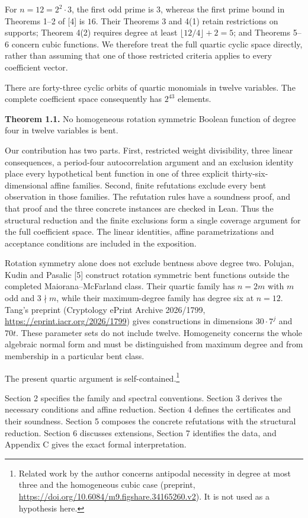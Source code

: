 \documentclass[pdflatex,sn-mathphys-num]{sn-jnl}
\begin{document}
For $n=12=2^2\cdot3$, the first odd prime is $3$, whereas the first prime bound in Theorems 1--2 of [4] is $16$. Their Theorems 3 and 4(1) retain restrictions on supports; Theorem 4(2) requires degree at least $\lfloor12/4\rfloor+2=5$; and Theorems 5--6 concern cubic functions. We therefore treat the full quartic cyclic space directly, rather than assuming that one of those restricted criteria applies to every coefficient vector.

There are forty-three cyclic orbits of quartic monomials in twelve variables. The complete coefficient space consequently has $2^{43}$ elements.

\textbf{Theorem 1.1.} No homogeneous rotation symmetric Boolean function of degree four in twelve variables is bent.

Our contribution has two parts. First, restricted weight divisibility, three linear consequences, a period-four autocorrelation argument and an exclusion identity place every hypothetical bent function in one of three explicit thirty-six-dimensional affine families. Second, finite refutations exclude every bent observation in those families. The refutation rules have a soundness proof, and that proof and the three concrete instances are checked in Lean. Thus the structural reduction and the finite exclusions form a single coverage argument for the full coefficient space. The linear identities, affine parametrizations and acceptance conditions are included in the exposition.

Rotation symmetry alone does not exclude bentness above degree two. Polujan, Kudin and Pasalic [5] construct rotation symmetric bent functions outside the completed Maiorana--McFarland class. Their quartic family has $n=2m$ with $m$ odd and $3\nmid m$, while their maximum-degree family has degree six at $n=12$. Tang's preprint (Cryptology ePrint Archive 2026/1799, \url{https://eprint.iacr.org/2026/1799}) gives constructions in dimensions $30\cdot7^j$ and $70t$. These parameter sets do not include twelve. Homogeneity concerns the whole algebraic normal form and must be distinguished from maximum degree and from membership in a particular bent class.

The present quartic argument is self-contained.\footnote{Related work by the author concerns antipodal necessity in degree at most three and the homogeneous cubic case (preprint, \url{https://doi.org/10.6084/m9.figshare.34165260.v2}). It is not used as a hypothesis here.}


Section 2 specifies the family and spectral conventions. Section 3 derives the necessary conditions and affine reduction. Section 4 defines the certificates and their soundness. Section 5 composes the concrete refutations with the structural reduction. Section 6 discusses extensions, Section 7 identifies the data, and Appendix C gives the exact formal interpretation.
\end{document}
